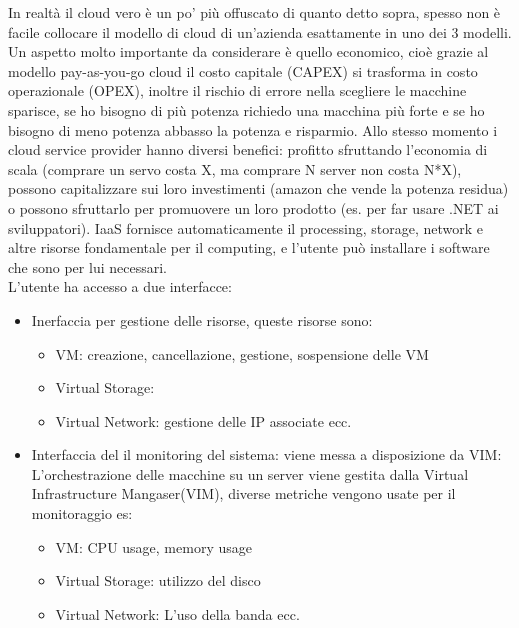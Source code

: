 \documentclass[11pt, twocolumn]{article}
\begin{document}
In realtà il cloud vero è un po' più offuscato di quanto detto sopra, spesso non è facile collocare il modello di cloud di un'azienda esattamente in uno dei 3 modelli.\\
Un aspetto molto importante da considerare è quello economico, cioè grazie al modello pay-as-you-go cloud il costo capitale (CAPEX) si trasforma in costo operazionale (OPEX), inoltre il rischio di errore nella scegliere le macchine sparisce, se ho bisogno di più potenza richiedo una macchina più forte e se ho bisogno di meno potenza abbasso la potenza e risparmio.
Allo stesso momento i cloud service provider hanno diversi benefici: profitto sfruttando l'economia di scala (comprare un servo costa X, ma comprare N server non costa N*X), possono capitalizzare sui loro investimenti (amazon che vende la potenza residua) o possono sfruttarlo per promuovere un loro prodotto (es. per far usare .NET ai sviluppatori).
IaaS fornisce automaticamente il processing, storage, network e altre risorse fondamentale per il computing, e l'utente può installare i software che sono per lui necessari.
\\
L'utente ha accesso a due interfacce:
\begin{itemize}
	\item Inerfaccia per gestione delle risorse, queste risorse sono:
	\begin{itemize}
		\item VM: creazione, cancellazione, gestione, sospensione delle VM 
		\item Virtual Storage:
		\item Virtual Network: gestione delle IP associate ecc.
	\end{itemize}
	\item Interfaccia del il monitoring del sistema: viene messa a disposizione da VIM: L'orchestrazione delle macchine su un server viene gestita dalla Virtual Infrastructure Mangaser(VIM), diverse metriche vengono usate per il monitoraggio es:
	\begin{itemize}
		\item VM: CPU usage, memory usage
		\item Virtual Storage: utilizzo del disco
		\item Virtual Network: L'uso della banda ecc.
	\end{itemize}
\end{itemize}
 
\end{document}
